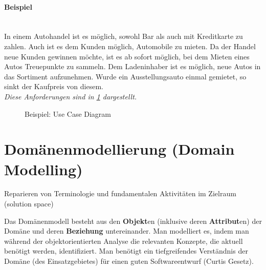 \documentclass[ngerman,color=3b]{tuda_summary}
\begin{document}
\paragraph{Beispiel}\mbox{}\\
In einem Autohandel ist es möglich, sowohl Bar als auch mit Kreditkarte zu zahlen. Auch ist es dem Kunden möglich, Automobile zu mieten. Da der Handel neue Kunden gewinnen möchte, ist es ab sofort möglich, bei dem Mieten eines Autos Treuepunkte zu sammeln. Dem Ladeninhaber ist es möglich, neue Autos in das Sortiment aufzunehmen. Wurde ein Ausstellungsauto einmal gemietet, so sinkt der Kaufpreis von diesem. \\ \textit{Diese Anforderungen sind in \figurename{} \ref{fig:usecase} dargestellt.}
\begin{figure}[ht]
    \centering
    \caption{Beispiel: Use Case Diagram}
    \label{fig:usecase}
\end{figure}

\FloatBarrier{}
\section{Domänenmodellierung (Domain Modelling)}
\begin{definition}
    Reparieren von Terminologie und fundamentalen Aktivitäten im Zielraum (solution space)
\end{definition}
\begin{definition}
    Das Domänenmodell besteht aus den \textbf{Objekt}en (inklusive deren \textbf{Attribut}en) der Domäne und deren  \textbf{Beziehung}  untereinander.
    Man modelliert es, indem man während der objektorientierten Analyse die relevanten Konzepte, die aktuell benötigt werden, identifiziert. Man benötigt ein tiefgreifendes Verständnis der Domäne (des Einsatzgebietes) für einen guten Softwareentwurf (Curtis Gesetz).
\end{definition}
\end{document}
